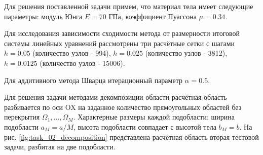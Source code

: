 \documentclass[a4paper]{article}
\begin{document}
Для решения поставленной задачи примем, что материал тела имеет следующие параметры: модуль Юнга $E = 70$ ГПа, коэффициент Пуассона $\mu = 0.34$. 

Для исследования зависимости сходимости метода от размерности итоговой системы линейных уравнений рассмотрены три расчётные сетки с шагами $h = 0.05$ (количество узлов - 994), $h = 0.025$ (количество узлов - 3812), $h = 0.0125$ (количество узлов - 15006).

Для аддитивного метода Шварца итерационный параметр $\alpha = 0.5$.

\newpage

Для решения задачи методами декомпозиции области расчётная область разбивается по оси OX на заданное количество прямоугольных областей без перекрытия $\Omega_1, \ldots, \Omega_M$. Характерные размеры каждой подобласти: ширина подобласти $a_M = a / M$, высота подобласти совпадает с высотой тела $b_M = b$. На рис. \ref{fig:task_02_decomposition} представлена расчётная область вторая тестовой задачи, разбитая на две подобласти.
\end{document}
